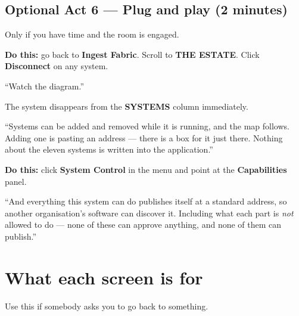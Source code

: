 \documentclass[11pt,a4paper]{article}
\newcommand{\ui}[1]{\textbf{#1}}          %
\begin{document}
\subsection{Optional Act 6 --- Plug and play (2 minutes)}

Only if you have time and the room is engaged.

\textbf{Do this:} go back to \ui{Ingest Fabric}. Scroll to \ui{THE ESTATE}.
Click \ui{Disconnect} on any system.

\begin{say}
``Watch the diagram.''
\end{say}

The system disappears from the \ui{SYSTEMS} column immediately.

\begin{say}
``Systems can be added and removed while it is running, and the map follows.
Adding one is pasting an address --- there is a box for it just there. Nothing
about the eleven systems is written into the application.''
\end{say}

\textbf{Do this:} click \ui{System Control} in the menu and point at the
\ui{Capabilities} panel.

\begin{say}
``And everything this system can do publishes itself at a standard address, so
another organisation's software can discover it. Including what each part is
\emph{not} allowed to do --- none of these can approve anything, and none of
them can publish.''
\end{say}

\section{What each screen is for}

Use this if somebody asks you to go back to something.
\end{document}
